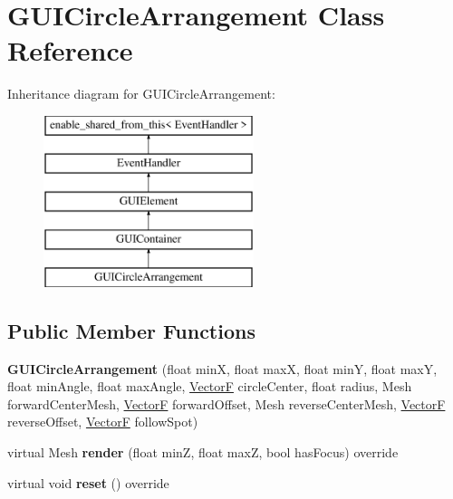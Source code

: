 \hypertarget{classGUICircleArrangement}{\section{G\+U\+I\+Circle\+Arrangement Class Reference}
\label{classGUICircleArrangement}
}
Inheritance diagram for G\+U\+I\+Circle\+Arrangement\+:\begin{figure}[H]
\begin{center}
\leavevmode
\includegraphics[height=5.000000cm]{classGUICircleArrangement}
\end{center}
\end{figure}
\subsection*{Public Member Functions}
\begin{DoxyCompactItemize}
\item 
\hypertarget{classGUICircleArrangement_ac7eb93439810e4d6aff2bfbf28dc3930}{{\bfseries G\+U\+I\+Circle\+Arrangement} (float min\+X, float max\+X, float min\+Y, float max\+Y, float min\+Angle, float max\+Angle, \hyperlink{structVectorF}{Vector\+F} circle\+Center, float radius, Mesh forward\+Center\+Mesh, \hyperlink{structVectorF}{Vector\+F} forward\+Offset, Mesh reverse\+Center\+Mesh, \hyperlink{structVectorF}{Vector\+F} reverse\+Offset, \hyperlink{structVectorF}{Vector\+F} follow\+Spot)}\label{classGUICircleArrangement_ac7eb93439810e4d6aff2bfbf28dc3930}

\item 
\hypertarget{classGUICircleArrangement_a0df24b0c558e1aa17954c892edd99e11}{virtual Mesh {\bfseries render} (float min\+Z, float max\+Z, bool has\+Focus) override}\label{classGUICircleArrangement_a0df24b0c558e1aa17954c892edd99e11}

\item 
\hypertarget{classGUICircleArrangement_a126581e38e196a5955b372556b833f56}{virtual void {\bfseries reset} () override}\label{classGUICircleArrangement_a126581e38e196a5955b372556b833f56}

\end{DoxyCompactItemize}
